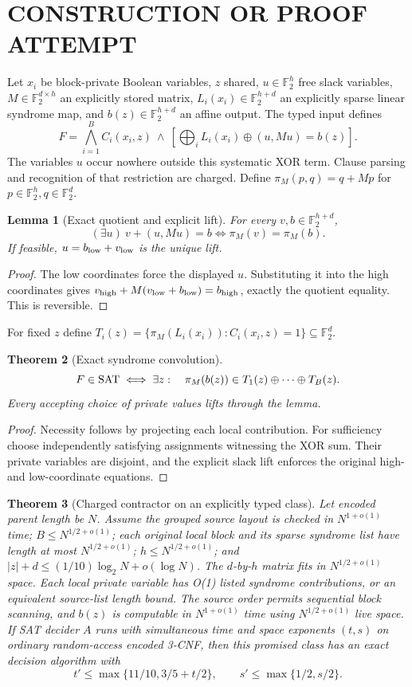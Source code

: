 \documentclass[11pt]{article}
\newtheorem{theorem}{Theorem}
\newtheorem{lemma}[theorem]{Lemma}
\newcommand{\F}{\mathbb F_2}
\begin{document}
\section{CONSTRUCTION OR PROOF ATTEMPT}
Let $x_i$ be block-private Boolean variables, $z$ shared,
$u\in\F^h$ free slack variables, $M\in\F^{d\times h}$ an explicitly
stored matrix, $L_i(x_i)\in\F^{h+d}$ an explicitly sparse linear
syndrome map, and $b(z)\in\F^{h+d}$ an affine output.
The typed input defines
\[
 F=\bigwedge_{i=1}^{B} C_i(x_i,z)\ \land\
 \left[\bigoplus_i L_i(x_i)\oplus(u,Mu)=b(z)\right].       \tag{1}
\]
The variables $u$ occur nowhere outside this systematic XOR term.
Clause parsing and recognition of that restriction are charged.
Define $\pi_M(p,q)=q+Mp$ for $p\in\F^h,q\in\F^d$.
\begin{lemma}[Exact quotient and explicit lift]
For every $v,b\in\F^{h+d}$,
\[
(\exists u)\ v+(u,Mu)=b\iff \pi_M(v)=\pi_M(b).
\]
If feasible, $u=b_{\rm low}+v_{\rm low}$ is the unique lift.
\end{lemma}
\begin{proof}
The low coordinates force the displayed $u$. Substituting it into
the high coordinates gives
$v_{\rm high}+M(v_{\rm low}+b_{\rm low})=b_{\rm high}$,
exactly the quotient equality. This is reversible.
\end{proof}
For fixed $z$ define
$T_i(z)=\{\pi_M(L_i(x_i)):C_i(x_i,z)=1\}\subseteq\F^d$.
\begin{theorem}[Exact syndrome convolution]
\[
 F\in{\rm SAT}\iff
 \exists z:\quad\pi_M(b(z))\in T_1(z)\oplus\cdots\oplus T_B(z).
\]
Every accepting choice of private values lifts through the lemma.
\end{theorem}
\begin{proof}
Necessity follows by projecting each local contribution.
For sufficiency choose independently satisfying assignments
witnessing the XOR sum. Their private variables are disjoint,
and the explicit slack lift enforces the original high-
and low-coordinate equations.
\end{proof}
\begin{theorem}[Charged contractor on an explicitly typed class]
Let encoded parent length be $N$. Assume the grouped source layout
is checked in $N^{1+o(1)}$ time; $B\le N^{1/2+o(1)}$;
each original local block and its sparse syndrome list have length
at most $N^{1/2+o(1)}$; $h\le N^{1/2+o(1)}$; and
$|z|+d\le(1/10)\log_2 N+o(\log N)$.
The $d$-by-$h$ matrix fits in $N^{1/2+o(1)}$ space.
Each local private variable has O(1) listed syndrome contributions,
or an equivalent source-list length bound.
The source order permits sequential block scanning, and
$b(z)$ is computable in $N^{1+o(1)}$ time using
$N^{1/2+o(1)}$ live space.
If SAT decider $A$ runs with simultaneous time and space
exponents $(t,s)$ on ordinary random-access encoded 3-CNF,
then this promised class has an exact decision algorithm with
\[
 t'\le\max\{11/10,3/5+t/2\},\qquad
 s'\le\max\{1/2,s/2\}.                                 \tag{2}
\]
\end{theorem}
\end{document}
